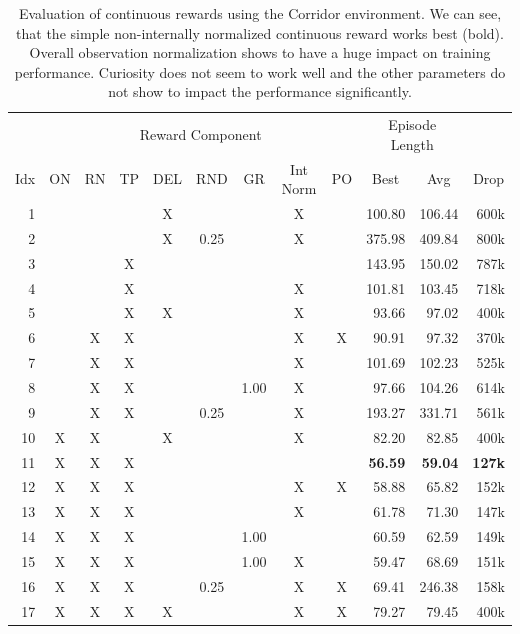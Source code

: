 \begin{table}[ht!]
    \begin{center}
        \begin{tabular}{rccccccccrrr}
            \toprule
             & \multicolumn{8}{c}{Reward Component} & \multicolumn{2}{c}{Episode Length} & \\
            \cmidrule(lr){2-9}\cmidrule(lr){10-11}
            \multicolumn{1}{c}{Idx} & \multicolumn{1}{c}{ON} & \multicolumn{1}{c}{RN} & \multicolumn{1}{c}{TP} & \multicolumn{1}{c}{DEL} & \multicolumn{1}{c}{RND} & \multicolumn{1}{c}{GR} & \multicolumn{1}{c}{Int Norm} & \multicolumn{1}{c}{PO} & \multicolumn{1}{c}{Best} & \multicolumn{1}{c}{Avg} & \multicolumn{1}{c}{Drop}\\
            \midrule
            1 &  &  &  & X &  &  & X &  & 100.80 & 106.44 & 600k \\
            2 &  &  &  & X & 0.25 &  & X &  & 375.98 & 409.84 & 800k \\
            3 &  &  & X &  &  &  &  &  & 143.95 & 150.02 & 787k \\
            4 &  &  & X &  &  &  & X &  & 101.81 & 103.45 & 718k \\
            5 &  &  & X & X &  &  & X &  & 93.66 & 97.02 & 400k \\
            6 &  & X & X &  &  &  & X & X & 90.91 & 97.32 & 370k \\
            7 &  & X & X &  &  &  & X &  & 101.69 & 102.23 & 525k \\
            8 &  & X & X &  &  & 1.00 & X &  & 97.66 & 104.26 & 614k \\
            9 &  & X & X &  & 0.25 &  & X &  & 193.27 & 331.71 & 561k \\
            10 & X & X &  & X &  &  & X &  & 82.20 & 82.85 & 400k \\
            11 & X & X & X &  &  &  &  &  & \textbf{56.59} & \textbf{59.04} & \textbf{127k} \\
            12 & X & X & X &  &  &  & X & X & 58.88 & 65.82 & 152k \\
            13 & X & X & X &  &  &  & X &  & 61.78 & 71.30 & 147k \\
            14 & X & X & X &  &  & 1.00 &  &  & 60.59 & 62.59 & 149k \\
            15 & X & X & X &  &  & 1.00 & X &  & 59.47 & 68.69 & 151k \\
            16 & X & X & X &  & 0.25 &  & X & X & 69.41 & 246.38 & 158k \\
            17 & X & X & X & X &  &  & X & X & 79.27 & 79.45 & 400k \\
            \bottomrule
        \end{tabular}
    \end{center}
    \caption[Evaluation of Continuous Reward using the Corridor Environment]{Evaluation of continuous rewards using the Corridor environment. We can see, that the simple non-internally normalized continuous reward works best (bold). Overall observation normalization shows to have a huge impact on training performance. Curiosity does not seem to work well and the other parameters do not show to impact the performance significantly.} \label{tab:Maze0318/Reward/Continuous}
\end{table}

